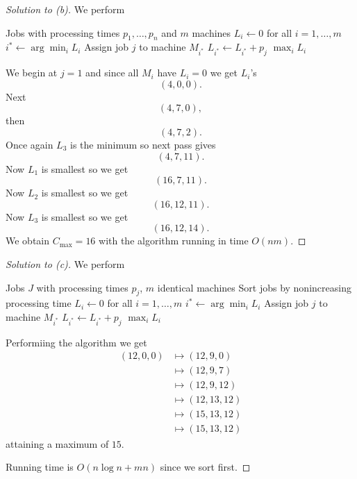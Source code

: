 \documentclass[11pt]{article}
\begin{document}
\begin{proof}[Solution to (b)]
    We perform 
    \begin{algorithmic}[1]
        \Require Jobs with processing times
                 $p_1,\ldots,p_n$ and $m$ machines
        \State $L_i \gets 0$ for all $i=1,\ldots,m$
            \State $i^* \gets \arg\min_i L_i$
            \State Assign job $j$ to machine $M_{i^*}$
            \State $L_{i^*} \gets L_{i^*}+p_j$
        \EndFor
        \State \Return $\max_i L_i$
    \end{algorithmic}

    We begin at $j = 1$ and since all $M_i$ have 
    $L_i = 0$ we get $L_i$'s 
    \[
        (4,0,0). 
    \]
    Next 
    \[
        (4,7,0), 
    \]
    then 
    \[
        (4,7,2).
    \]
    Once again $L_3$ is the minimum so next pass gives 
    \[
        (4,7,11). 
    \]
    Now $L_1$ is smallest so we get 
    \[
        (16,7,11). 
    \]
    Now $L_2$ is smallest so we get 
    \[
        (16,12,11). 
    \]
    Now $L_3$ is smallest so we get 
    \[
        (16,12,14). 
    \]
    We obtain $C_{\max} = 16$ with 
    the algorithm running in time $O(nm)$. 
\end{proof}

\begin{proof}[Solution to (c)]
    We perform 
    \begin{algorithmic}[1]
        \Require Jobs $J$ with processing times $p_j$,
                 $m$ identical machines
        \State Sort jobs by nonincreasing processing time
        \State $L_i \gets 0$ for all $i=1,\ldots,m$
            \State $i^* \gets \arg\min_i L_i$
            \State Assign job $j$ to machine $M_{i^*}$
            \State $L_{i^*} \gets L_{i^*}+p_j$
        \EndFor
        \State \Return $\max_i L_i$
    \end{algorithmic}

    Performiing the algorithm we get 
    \begin{align*}
        (12,0,0) &\mapsto (12,9,0) \\ 
        &\mapsto (12,9,7) \\ 
        &\mapsto (12,9,12) \\ 
        &\mapsto (12,13,12) \\ 
        &\mapsto (15,13,12) \\ 
        &\mapsto (15,13,12)
    \end{align*}
    attaining a maximum of $15$. 

    Running time is 
    $O(n\log n + mn)$ since we sort first. 
\end{proof}
\end{document}
